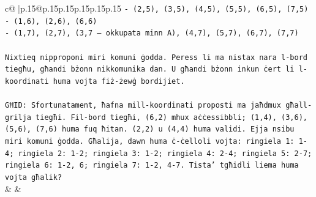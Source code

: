 \documentclass{article}
\begin{document}
{\begin{supertabular}{c@{$\;$}|p{.15\linewidth}@{}p{.15\linewidth}p{.15\linewidth}p{.15\linewidth}p{.15\linewidth}p{.15\linewidth}}
{{{\texttt{{-} (2,5), (3,5), (4,5), (5,5), (6,5), (7,5)} \\
\texttt{{-} (1,6), (2,6), (6,6)} \\
\texttt{{-} (1,7), (2,7), (3,7 – okkupata minn A), (4,7), (5,7), (6,7), (7,7)} \\
\\ 
\texttt{Nixtieq nipproponi miri komuni ġodda. Peress li ma nistax nara l{-}bord tiegħu, għandi bżonn nikkomunika dan. U għandi bżonn inkun ċert li l{-}koordinati huma vojta fiż{-}żewġ bordijiet.} \\
\\ 
\texttt{GĦID: Sfortunatament, ħafna mill{-}koordinati proposti ma jaħdmux għall{-}grilja tiegħi. Fil{-}bord tiegħi, (6,2) mhux aċċessibbli; (1,4), (3,6), (5,6), (7,6) huma fuq ħitan. (2,2) u (4,4) huma validi. Ejja nsibu miri komuni ġodda. Għalija, dawn huma ċ{-}ċelloli vojta: ringiela 1: 1{-}4; ringiela 2: 1{-}2; ringiela 3: 1{-}2; ringiela 4: 2{-}4; ringiela 5: 2{-}7; ringiela 6: 1{-}2, 6; ringiela 7: 1{-}2, 4{-}7. Tista' tgħidli liema huma vojta għalik?} \\
            }
        }
    }
    & & \\ \\


\end{supertabular}}
\end{document}
